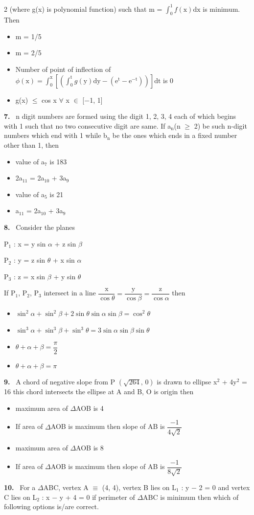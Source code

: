\documentclass[10pt]{extarticle}
\newcommand{\qn}[1]{\par\smallskip\noindent\textbf{#1.}~}
\newenvironment{qoptions}{\begin{itemize}[leftmargin=1.8em,itemsep=1pt,topsep=2pt,label={}]}{\end{itemize}}
\newcommand{\opt}[2]{\item[(#1)] #2}
\begin{document}
\begin{multicols}{2}
(where g(x) is polynomial function) such that m = $\displaystyle\int_0^1 f(\text{x})\text{dx}$ is minimum. Then
\begin{qoptions}
\opt{A}{m = 1/5}
\opt{B}{m = 2/5}
\opt{C}{Number of point of inflection of $\phi(\text{x}) = \displaystyle\int_0^\text{x}\left[\left(\int_0^\text{t} g(\text{y})\text{dy}-\left(\text{e}^\text{t}-\text{e}^{-\text{t}}\right)\right)\right]\text{dt}$ is 0}
\opt{D}{g(x) $\leqslant$ cos x $\forall$ x $\in$ [$-$1, 1]}
\end{qoptions}
\qn{7} n digit numbers are formed using the digit 1, 2, 3, 4 each of which begins with 1 such that no two consecutive digit are same. If a$_\text{n}$(n $\geqslant$ 2) be such n-digit numbers which end with 1 while b$_\text{n}$ be the ones which ends in a fixed number other than 1, then
\begin{qoptions}
\opt{A}{value of a$_7$ is 183}
\opt{B}{2a$_{11}$ = 2a$_{10}$ + 3a$_9$}
\opt{C}{value of a$_5$ is 21}
\opt{D}{a$_{11}$ = 2a$_{10}$ + 3a$_9$}
\end{qoptions}
\qn{8} Consider the planes\par
P$_1$ : x = y sin $\alpha$ + z sin $\beta$\par
P$_2$ : y = z sin $\theta$ + x sin $\alpha$\par
P$_3$ : z = x sin $\beta$ + y sin $\theta$\par
If P$_1$, P$_2$, P$_3$ intersect in a line $\dfrac{\text{x}}{\cos\theta}=\dfrac{\text{y}}{\cos\beta}=\dfrac{\text{z}}{\cos\alpha}$ then
\begin{qoptions}
\opt{A}{$\sin^2\alpha+\sin^2\beta+2\sin\theta\sin\alpha\sin\beta=\cos^2\theta$}
\opt{B}{$\sin^3\alpha+\sin^3\beta+\sin^3\theta=3\sin\alpha\sin\beta\sin\theta$}
\opt{C}{$\theta+\alpha+\beta=\dfrac{\pi}{2}$}
\opt{D}{$\theta+\alpha+\beta=\pi$}
\end{qoptions}
\qn{9} A chord of negative slope from P $\left(\sqrt{264},\,0\right)$ is drawn to ellipse x$^2$ + 4y$^2$ = 16 this chord intersects the ellipse at A and B, O is origin then
\begin{qoptions}
\opt{A}{maximum area of $\Delta$AOB is 4}
\opt{B}{If area of $\Delta$AOB is maximum then slope of AB is $\dfrac{-1}{4\sqrt{2}}$}
\opt{C}{maximum area of $\Delta$AOB is 8}
\opt{D}{If area of $\Delta$AOB is maximum then slope of AB is $\dfrac{-1}{8\sqrt{2}}$}
\end{qoptions}
\qn{10} For a $\Delta$ABC, vertex A $\equiv$ (4, 4), vertex B lies on L$_1$ : y $-$ 2 = 0 and vertex C lies on L$_2$ : x $-$ y + 4 = 0 if perimeter of $\Delta$ABC is minimum then which of following options is/are correct.

\end{multicols}
\end{document}
